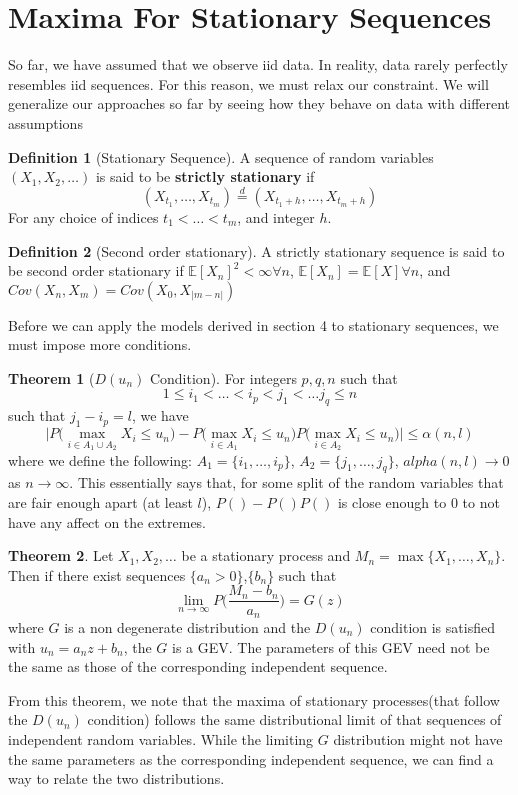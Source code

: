 \documentclass{article}
\theoremstyle{definition}
\newtheorem{theorem}{Theorem}
\theoremstyle{definition}
\newtheorem{definition}{Definition}
\def\E{\mathbb{E}}
\begin{document}
\section{Maxima For Stationary Sequences}
So far, we have assumed that we observe iid data. In reality, data rarely perfectly resembles iid sequences. For this reason, we must relax our constraint. We will generalize our approaches so far by seeing how they behave on data with different assumptions
\begin{definition}[Stationary Sequence] A sequence of random variables $(X_1,X_2, \hdots)$ is said to be \textbf{strictly stationary} if 
\[(X_{t_1},\hdots, X_{t_m}) \overset{d}{=} (X_{t_1+h},\hdots, X_{t_m+h}) \]
For any choice of indices $t_1<\hdots<t_m$, and integer $h$. 
\end{definition}
\begin{definition}[Second order stationary]
A strictly stationary sequence is said to be second order stationary if $\E[X_n]^2<\infty \forall n$, $\E[X_n]=\E[X] \forall n$, and $Cov(X_n, X_m)= Cov(X_0, X_{|m-n|})$
\end{definition}
Before we can apply the models derived in section 4 to stationary sequences, we must impose more conditions. 
\begin{theorem}[$D(u_n)$ Condition]
For integers $p,q,n$ such that 
\[1 \leq i_1< \hdots< i_p< j_1<\hdots j_q\leq n\]
such that $j_1- i_p=l$, we have 
\[\bigg|P\bigg(\max_{i\in A_1\cup A_2} X_i\leq u_n\bigg)- P\bigg(\max_{i\in A_1} X_i\leq u_n\bigg)P\bigg(\max_{i\in A_2} X_i\leq u_n\bigg) \bigg|\leq \alpha(n,l)\]
where we define the following:
$A_1=\{i_1, \hdots, i_p\}$, $A_2=\{j_1, \hdots, j_q\}$, $alpha(n,l)\rightarrow 0$ as $n\rightarrow \infty$. 
This essentially says that, for some split of the random variables that are fair enough apart (at least $l$), $P()-P()P()$ is close enough to 0 to not have any affect on the extremes.
\end{theorem}
\begin{theorem}
Let $X_1,X_2,\hdots$ be a stationary process and $M_n= \max\{X_1, \hdots, X_n\}$. Then if there exist sequences $\{a_n>0\}$,$\{b_n\}$ such that 
\[\lim_{n\rightarrow \infty}P\bigg( \frac{M_n-b_n}{a_n} \bigg)= G(z)\]
where $G$ is a non degenerate distribution and the $D(u_n)$ condition is satisfied with $u_n=a_nz+b_n$, the $G$ is a GEV. The parameters of this GEV need not be the same as those of the corresponding independent sequence.
\end{theorem}
From this theorem, we note that the maxima of stationary processes(that follow the $D(u_n)$ condition) follows the same distributional limit of that sequences of independent random variables. While the limiting $G$ distribution might not have the same parameters as the corresponding independent sequence, we can find a way to relate the two distributions.
\end{document}
